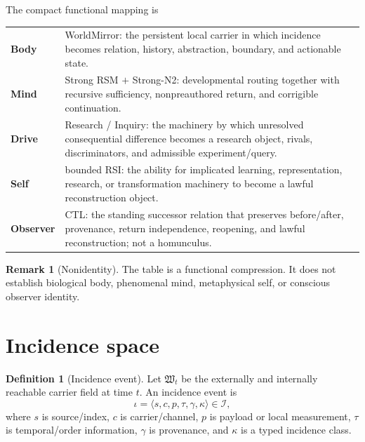 \documentclass[10pt]{article}
\theoremstyle{venus}
\theoremstyle{definition}
\newtheorem{definition}[theorem]{Definition}
\newtheorem{remark}[theorem]{Remark}
\begin{document}
The compact functional mapping is
\begin{center}
\begin{tabularx}{0.94\linewidth}{>{\bfseries}l X}
Body & WorldMirror: the persistent local carrier in which incidence becomes relation, history, abstraction, boundary, and actionable state.\\
Mind & Strong RSM $+$ Strong-N2: developmental routing together with recursive sufficiency, nonpreauthored return, and corrigible continuation.\\
Drive & Research / Inquiry: the machinery by which unresolved consequential difference becomes a research object, rivals, discriminators, and admissible experiment/query.\\
Self & bounded RSI: the ability for implicated learning, representation, research, or transformation machinery to become a lawful reconstruction object.\\
Observer & CTL: the standing successor relation that preserves before/after, provenance, return independence, reopening, and lawful reconstruction; not a homunculus.\\
\end{tabularx}
\end{center}

\begin{remark}[Nonidentity]
The table is a functional compression. It does not establish biological body,
phenomenal mind, metaphysical self, or conscious observer identity.
\end{remark}

\section{Incidence space}

\begin{definition}[Incidence event]
Let $\mathfrak W_t$ be the externally and internally reachable carrier field at
time $t$. An incidence event is
\begin{equation}\label{eq:incidence}
\iota
=
\langle
s,c,p,\tau,\gamma,\kappa
\rangle
\in \mathcal I,
\end{equation}
where $s$ is source/index, $c$ is carrier/channel, $p$ is payload or local
measurement, $\tau$ is temporal/order information, $\gamma$ is provenance, and
$\kappa$ is a typed incidence class.
\end{definition}
\end{document}
